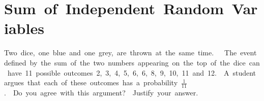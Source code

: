 \documentclass[journal,12pt,twocolumn]{IEEEtran}
\begin{document}
  
  
  
  
  
  
  
 \section{Sum of Independent Random Variables} 
 Two dice, one blue and one grey, are thrown at the same time.   The event defined by the sum of the two numbers appearing on the top of the dice can have 11 possible outcomes 2, 3, 4, 5, 6, 6, 8, 9, 10, 11 and 12.  A student argues that each of these outcomes has a probability $\frac{1}{11}$.  Do you agree with this argument?  Justify your answer. 
  
\end{document}
